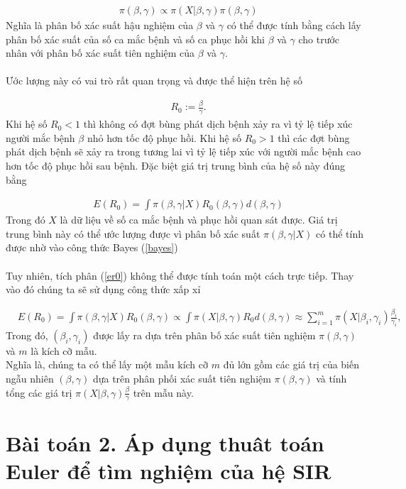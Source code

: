 \documentclass[a4paper]{article}
\begin{document}
	\begin{align} \label{bayes}
	&\pi(\beta, \gamma) \propto \pi(X|\beta, \gamma)\pi(\beta,\gamma)
	\end{align}
Nghĩa là phân bố xác suất hậu nghiệm của $\beta$ và $\gamma$ có thể được tính bằng cách lấy phân bố xác
suất của số ca mắc bệnh và số ca phục hồi khi $\beta$ và $\gamma$ cho trước nhân với phân bố xác suất tiên
nghiệm của $\beta$ và $\gamma$. \\
\\
Ước lượng này có vai trò rất quan trọng và được thể hiện trên hệ số 

	\begin{align}
	&R_0 := \frac{\beta}{\gamma}.
	\end{align}
Khi hệ số $R_0 < 1$ thì không có đợt bùng phát dịch bệnh xảy ra vì tỷ lệ tiếp xúc người mắc bệnh $\beta$ nhỏ hơn tốc độ phục hồi. Khi hệ số $R_0 > 1$ thì các đợt bùng phát dịch bệnh sẽ xảy ra trong tương lai vì tỷ lệ tiếp xúc với người mắc bệnh cao hơn tốc độ phục hồi sau bệnh. Đặc biệt giá trị trung bình của hệ số này đúng bằng

	\begin{align} \label{er0}
	&E(R_0) = \int \pi (\beta, \gamma | X) R_0 (\beta, \gamma) d(\beta, \gamma)
	\end{align}
Trong đó $X$ là dữ liệu về số ca mắc bệnh và phục hồi quan sát được. Giá trị trung bình này có
thể ước lượng được vì phân bố xác suất $\pi (\beta, \gamma | X)$ có thể tính được nhờ vào công thức Bayes
(\ref{bayes}) \\
\\
Tuy nhiên, tích phân (\ref{er0}) không thể được tính toán một cách trực tiếp. Thay vào đó chúng
ta sẽ sử dụng công thức xấp xỉ

	\begin{align}
	&E(R_0) = \int \pi(\beta, \gamma|X)R_0(\beta,\gamma) \propto \int \pi(X|\beta, \gamma) R_0 d(\beta,\gamma) \approx \sum_{i = 1}^{m} \pi (X| \beta_i, \gamma_i) \frac{\beta_i}{\gamma_i},
	\end{align}
Trong đó, $(\beta_i, \gamma_i)$ được lấy ra dựa trên phân bố xác suất tiên nghiệm $\pi(\beta, \gamma)$ và $m$ là kích cỡ mẫu. \\
\qquad Nghĩa là, chúng ta có thể lấy một mẫu kích cỡ $m$ đủ lớn gồm các giá trị của biến ngẫu nhiên $(\beta, \gamma)$ dựa trên phân phối xác suất tiên nghiệm $\pi(\beta, \gamma)$ và tính tổng các giá trị $\pi(X|\beta, \gamma)\frac{\beta}{\gamma}$ trên mẫu này.

\section{Bài toán 2. Áp dụng thuât toán Euler để tìm nghiệm của hệ SIR}
\end{document}
